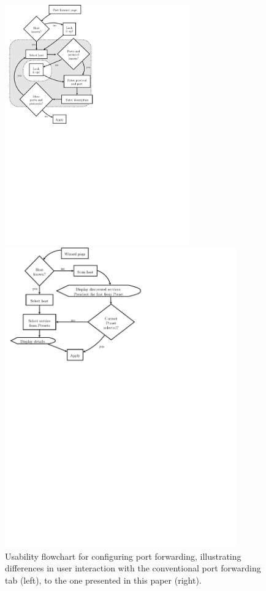 \documentclass[a4paper,11pt,makeidx]{kth-bcs}
\begin{document}
\begin{figure}[h] %
   \begin{minipage}[b]{0.45\linewidth}
      \centering
      \includegraphics[trim = 4mm 140mm 90mm 0mm, clip, width=8cm,natwidth=2.570in,natheight=0.580in]{before}
   \end{minipage}
   \begin{minipage}[b]{0.45\linewidth}
      \centering
      \includegraphics[trim = 0mm 174mm 80mm 0mm, clip, width=10cm,natwidth=2.570in,natheight=0.580in]{after}
   \end{minipage}
   \caption{Usability flowchart for configuring port forwarding, illustrating differences in user interaction with the conventional port forwarding tab (left), to the one presented in this paper (right).}
   \label{fig:usability}
\end{figure}
\end{document}

